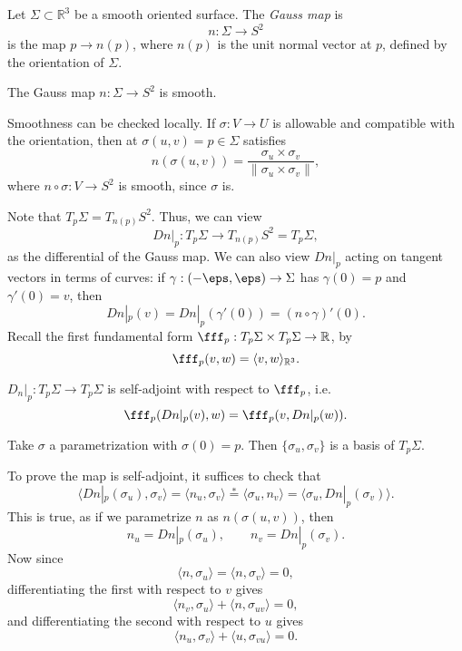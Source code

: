 \documentclass[12pt]{article}
\begin{document}
\begin{definition}
	Let $\Sigma \subset \mathbb{R}^3$ be a smooth oriented surface. The \emph{Gauss map} is
	\[
	n : \Sigma \to S^2
	\]
	is the map $p \to n(p)$, where $n(p)$ is the unit normal vector at $p$, defined by the orientation of $\Sigma$.
\end{definition}

\begin{lemma}
	The Gauss map $n : \Sigma \to S^2$ is smooth.
\end{lemma}

\begin{proofbox}
	Smoothness can be checked locally. If $\sigma : V \to U$ is allowable and compatible with the orientation, then at $\sigma(u, v) = p \in \Sigma$ satisfies
	\[
	n(\sigma(u, v)) = \frac{\sigma_{u} \times \sigma_v}{\| \sigma_u \times \sigma_v\|}
	,\]
	where $n \circ \sigma : V \to S^2$ is smooth, since $\sigma$ is.
\end{proofbox}

Note that $T_p\Sigma = T_{n(p)}S^2$. Thus, we can view
\[
Dn|_p : T_p \Sigma \to T_{n(p)} S^2 = T_p \Sigma
,\]
as the differential of the Gauss map. We can also view $Dn|_p$ acting on tangent vectors in terms of curves: if $\gamma : (-\eps, \eps) \to \Sigma$ has $\gamma(0) = p$ and $\gamma'(0) = v$, then
\[
Dn|_p(v) = Dn|_p(\gamma'(0)) = (n \circ \gamma)'(0)
.\]
Recall the first fundamental form $\fff_p : T_p \Sigma \times T_p \Sigma \to \mathbb{R}$, by
\[
\fff_p(v, w) = \langle v, w \rangle_{\mathbb{R}^3}
.\]

\begin{lemma}
	$D_n|_p : T_p \Sigma \to T_p \Sigma$ is self-adjoint with respect to $\fff_p$, i.e.
	\[
	\fff_p(Dn|_p(v), w) = \fff_p(v, Dn|_p(w))
	.\]
\end{lemma}

\begin{proofbox}
	Take $\sigma$ a parametrization with $\sigma(0) = p$. Then $\{\sigma_u, \sigma_v\}$ is a basis of $T_p \Sigma$.

	To prove the map is self-adjoint, it suffices to check that
	\[
		\langle Dn|_p(\sigma_u), \sigma_v \rangle = \langle n_u, \sigma_v \rangle \overset{\ast}{=} \langle \sigma_u, n_v \rangle = \langle \sigma_u, Dn|_p(\sigma_v) \rangle
	.\]
	This is true, as if we parametrize $n$ as $n(\sigma(u,v))$, then
	\[
	n_u = Dn|_p(\sigma_u), \qquad n_v = Dn|_p(\sigma_v)
	.\]
	Now since
	\[
	\langle n, \sigma_u \rangle = \langle n, \sigma_v \rangle = 0
	,\]
	differentiating the first with respect to $v$ gives
	\[
	\langle n_v, \sigma_u \rangle + \langle n, \sigma_{uv} \rangle = 0
	,\]
	and differentiating the second with respect to $u$ gives
	\[
	\langle n_u, \sigma_v \rangle + \langle u, \sigma_{vu} \rangle = 0
	.\]
\end{proofbox}
\end{document}
